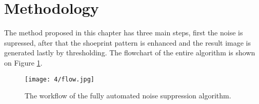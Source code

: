\documentclass[draft,final]{vutinfth} %
\begin{document}
\section{Methodology}
\par
The method proposed in this chapter has three main steps, first the noise is supressed, after that the shoeprint pattern is enhanced and the result image is generated lastly by thresholding.
The flowchart of the entire algorithm is shown on Figure \ref{fig:fans:workflow}.

\begin{figure}[h]
  \centering
  \texttt{[image: 4/flow.jpg]}
  \caption{The workflow of the fully automated noise suppression algorithm.}
  \label{fig:fans:workflow} %
\end{figure}
\end{document}
